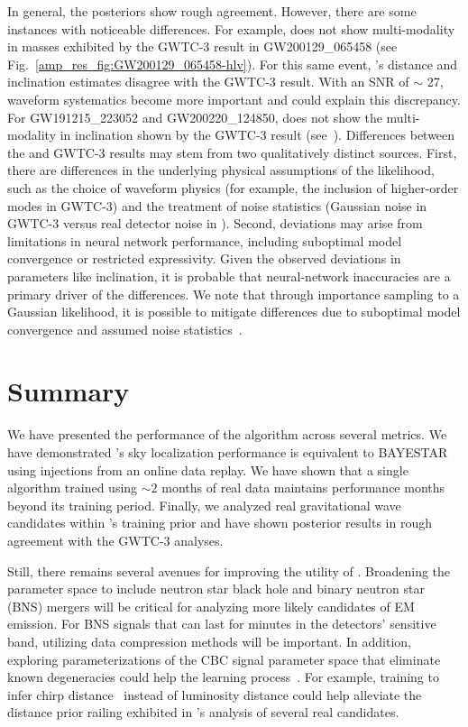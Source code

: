 \begin{refsection}
In general, the posteriors show rough agreement. 
However, there are some instances with noticeable differences. 
For example, \amplfi does not show multi-modality in masses exhibited by the GWTC-3 result in GW200129\_065458 (see Fig.~\ref{amp_res_fig:GW200129_065458-hlv}). 
For this same event, \amplfi's distance and inclination estimates disagree with the GWTC-3 result. 
With an SNR of $\sim$ 27, waveform systematics become more important and could explain this discrepancy. 
For GW191215\_223052 and GW200220\_124850, \amplfi does not show the multi-modality in inclination shown by the GWTC-3 result (see~). 
Differences between the \amplfi and GWTC-3 results may stem from two qualitatively distinct sources. 
First, there are differences in the underlying physical assumptions of the likelihood, such as the choice of waveform physics (for example, the inclusion of higher-order modes in GWTC-3) and the treatment of noise statistics (Gaussian noise in GWTC-3 versus real detector noise in \amplfi). 
Second, deviations may arise from limitations in neural network performance, including suboptimal model convergence or restricted expressivity. 
Given the observed deviations in parameters like inclination, it is probable that neural-network inaccuracies are a primary driver of the differences. 
We note that through importance sampling to a Gaussian likelihood, it is possible to mitigate differences due to suboptimal model convergence and assumed noise statistics~\cite{Dax_2023}.

\section{Summary}
We have presented the performance of the \amplfi algorithm across several metrics. 
We have demonstrated \amplfi's sky localization performance is equivalent to BAYESTAR using injections from an online data replay. 
We have shown that a single \amplfi algorithm trained using $\sim 2$ months of real data maintains performance months beyond its training period. 
Finally, we analyzed real gravitational wave candidates within \amplfi's training prior and have shown posterior results in rough agreement with the GWTC-3 analyses. 

Still, there remains several avenues for improving the utility of \amplfi.
Broadening the parameter space to include neutron star black hole and binary neutron star (BNS) mergers will be critical for analyzing more likely candidates of EM emission. 
For BNS signals that can last for minutes in the detectors' sensitive band, utilizing data compression methods will be important. 
In addition, exploring parameterizations of the CBC signal parameter space that eliminate known degeneracies could help the learning process~\cite{Roulet_2022}. 
For example, training \amplfi to infer chirp distance~\cite{Brady_2008} instead of luminosity distance could help alleviate the distance prior railing exhibited in \amplfi's analysis of several real candidates.


\end{refsection}
